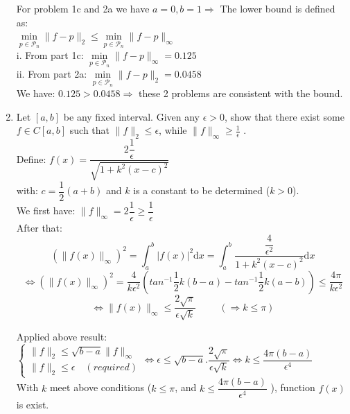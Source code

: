 \documentclass[14pt,a4paper]{article}
\begin{document}
\begin{enumerate}
	For problem 1c and 2a we have $a=0, b=1 \Rightarrow$ The lower bound is defined as:\\
	\hspace*{2cm} $\min\limits_{p \in \mathcal{P}_n} \|f-p\|_2 \leq \min\limits_{p \in \mathcal{P}_n} \|f-p\|_{\infty} $\\
	\hspace*{1cm} i. From part 1c: $\min\limits_{p \in \mathcal{P}_n} \|f-p\|_{\infty} = 0.125$\\
	\hspace*{1cm} ii. From part 2a: $\min\limits_{p \in \mathcal{P}_n} \|f-p\|_2 = 0.0458$\\
	We have: $0.125 > 0.0458 \Rightarrow$ these 2 problems are consistent with the bound.
	\pagebreak
	
	\label{2c}
	\item Let $[a,b]$ be any fixed interval. Given any $\epsilon > 0$, show that there exist some $f \in C[a,b]$ such that $\|f\|_2 \leq \epsilon$, while $\|f\|_{\infty} \geq \frac{1}{\epsilon}$ .\\
	Define: $f(x) = \dfrac{2\dfrac{1}{\epsilon}}{\sqrt{1+k^2(x-c)^2}}$\\
	with: $c = \dfrac{1}{2}(a+b)$ and $k$ is a constant to be determined ($k > 0$).\\
	We first have: $\|f\|_{\infty} = 2\dfrac{1}{\epsilon} \geq \dfrac{1}{\epsilon} $\\
	After that: $$\left(\|f(x)\|_{\infty}\right)^2 = \int_{a}^{b}|f(x)|^2\mathrm{d}x = \int_{a}^{b} \dfrac{\dfrac{4}{\epsilon^2}}{1+k^2(x-c)^2}\mathrm{d}x $$
	$$ \Leftrightarrow \left(\|f(x)\|_{\infty}\right)^2 = \dfrac{4}{k\epsilon^2}\left( tan^{-1}\frac{1}{2}k(b-a) - tan^{-1}\frac{1}{2}k(a-b)\right) \leq \dfrac{4\pi}{k\epsilon^2} $$
	$$ \Leftrightarrow \|f(x)\|_{\infty} \leq \dfrac{2\sqrt{\pi}}{\epsilon\sqrt{k}} \hspace{1cm} (\Rightarrow k \leq \pi)$$
	
	Applied above result:\\
	\hspace*{1cm} $\begin{cases} \|f\|_2 \leq \sqrt{b-a}\|f\|_{\infty} \\ \|f\|_2 \leq \epsilon \quad (required) \end{cases} \Leftrightarrow \epsilon \leq \sqrt{b-a}.\dfrac{2\sqrt{\pi}}{\epsilon\sqrt{k}} \Leftrightarrow k \leq \dfrac{4\pi(b-a)}{\epsilon^4}$\\
	With $k$ meet above conditions ($k \leq \pi$, and $ k \leq \dfrac{4\pi(b-a)}{\epsilon^4}$ ), function $f(x)$ is exist.\\
	
	
	
\end{enumerate}
\end{document}
